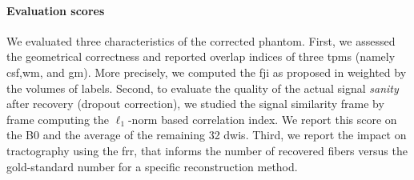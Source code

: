 \paragraph*{Evaluation scores}
We evaluated three characteristics of the corrected
phantom. First, we assessed the geometrical correctness
and reported overlap indices of three \glspl*{tpm} 
(namely \gls*{csf},\gls*{wm}, and \gls*{gm}).
More precisely, we computed the \gls*{fji} as 
proposed in \cite{crum_generalized_2006} weighted by 
the volumes of labels. 
Second, to evaluate the quality of the actual 
signal \emph{sanity} after recovery (dropout 
correction), we studied the signal similarity
frame by frame computing the $\ell_1$-norm
based correlation index. We report this score
on the B0 and the average of the remaining 32 
\glspl*{dwi}. Third, we report the 
impact on tractography using the \gls*{frr}, that 
informs the number of recovered fibers versus the 
gold-standard number for a specific reconstruction
method.
